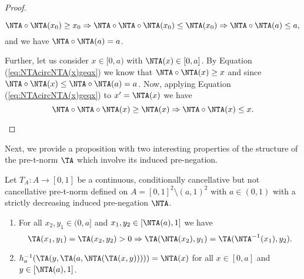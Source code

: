 \begin{proof}
\begin{enumerate}[label=(\roman*)]
\begin{itemize}
			$$\NTA \circ \NTA(x_0) \geq x_0 \Rightarrow \NTA \circ \NTA \circ \NTA (x_0) \leq \NTA(x_0) \Rightarrow  \NTA \circ \NTA(a) \leq a,$$
			and we have $\NTA \circ \NTA(a)=a$.
		\end{itemize}
		Further, let us consider $x \in [0,a)$ with $\NTA(x)\in [0,a]$. By Equation (\ref{eq:NTAcircNTA(x)geqx}) we know that $\NTA \circ \NTA(x) \geq x$  and since $\NTA \circ \NTA(x) \leq \NTA \circ \NTA(a)=a$. Now, applying Equation (\ref{eq:NTAcircNTA(x)geqx}) to $x'=\NTA(x)$  we have
		$$\NTA \circ \NTA \circ \NTA(x)  \geq \NTA(x) \Rightarrow \NTA \circ \NTA(x) \leq x. \vspace{-1cm}$$ \qedhere
	\end{enumerate}
\end{proof}
Next, we provide a proposition with two interesting properties of the structure of the pre-t-norm $\TA$ which involve its induced pre-negation.

\begin{proposition}\label{prop:PropietatsTACase(a,1)} Let $T_A: A \to [0,1]$ be a continuous, conditionally cancellative but not cancellative pre-t-norm defined on $A=[0,1]^2 \setminus (a,1)^2$ with $a \in (0,1)$ with a strictly decreasing induced pre-negation $\NTA$. \enlargethispage{12pt}
	\begin{enumerate}[label=(\roman*)]
		\item For all $x_2,y_1 \in (0,a]$ and $x_1,y_2 \in [\NTA(a),1]$ we have
		$$\TA(x_1,y_1)=\TA(x_2,y_2)>0 \Rightarrow \TA(\NTA(x_2),y_1)=\TA(\NTA^{-1}(x_1),y_2).$$
		\item $h_a^{-1}(\TA(y,\TA(a,\NTA(\TA(x,y))))) = \NTA(x)$ for all $x \in [0,a]$ and $y \in [\NTA(a),1]$.
	\end{enumerate}
\end{proposition}

